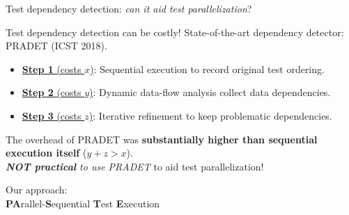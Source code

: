 \documentclass{beamer}
\begin{document}
\begingroup
\renewcommand{\disp}{}
\begin{frame}
	\begin{center}
		{\rsm Test dependency detection}: \textit{can it aid test parallelization}? 
	\end{center}
\end{frame}
\endgroup
\addtocounter{framenumber}{-1}

\begin{frame}{Test dependency detection can be costly!}
	State-of-the-art dependency detector: PRADET (ICST 2018).
	\vfill
	\begin{itemize}
		\fontsize{11}{11}\selectfont
		\item[]{\underline{\textbf{Step 1} (costs $x$)}: {\rsm Sequential execution} to record original test ordering.}\pause
		\item[]{\underline{\textbf{Step 2} (costs $y$)}: {\rsm Dynamic data-flow analysis} collect data dependencies.}\pause
		\item[]{\underline{\textbf{Step 3} (costs $z$)}: {\rsm Iterative refinement} to keep problematic dependencies.}\pause
	\end{itemize}
	\begin{center}
		\begin{tcolorbox}
			The overhead of {\rsm PRADET} was {\color{red} \textbf{substantially higher than sequential execution itself}} ($y+z>{x}$).\\\textit{\textbf{NOT practical} to use PRADET} to aid test parallelization!
		\end{tcolorbox}
	\end{center}
\end{frame}

\begingroup
\renewcommand{\disp}{}
\begin{frame}
	\begin{center}
		Our approach: \textbf{\tname}\\
		{\textbf{\rsm PA}rallel-\textbf{\rsm S}equential \textbf{\rsm T}est \textbf{\rsm E}xecution}
	\end{center}
\end{frame}
\endgroup
\addtocounter{framenumber}{-1}
\end{document}
